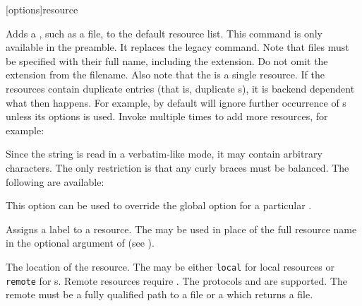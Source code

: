 \documentclass{ltxdockit}[2011/03/25]
\newcommand*{\biber}{\sty{biber}\xspace}
\begin{document}
\begin{ltxsyntax}

[options]{resource}

Adds a , such as a  file, to the default resource list. This command is only available in the preamble. It replaces the  legacy command. Note that files must be specified with their full name, including the extension. Do not omit the  extension from the filename. Also note that the  is a single resource. If the resources contain duplicate entries (that is, duplicate s), it is backend dependent what then happens. For example, by default \biber will ignore further occurrence of s unless its  options is used. Invoke  multiple times to add more resources, for example:

\begin{ltxexample}




\end{ltxexample}
%
Since the  string is read in a verbatim-like mode, it may contain arbitrary characters. The only restriction is that any curly braces must be balanced. The following  are available:

\begin{optionlist*}


This option can be used to override the global  option for a particular .


Assigns a label to a resource. The  may be used in place of the full resource name in the optional argument of  (see ).


The location of the resource. The  may be either \texttt{local} for local resources or \texttt{remote} for s. Remote resources require \biber. The protocols  and  are supported. The remote  must be a fully qualified path to a  file or a  which returns a  file.



\end{optionlist*}
\end{ltxsyntax}
\end{document}
